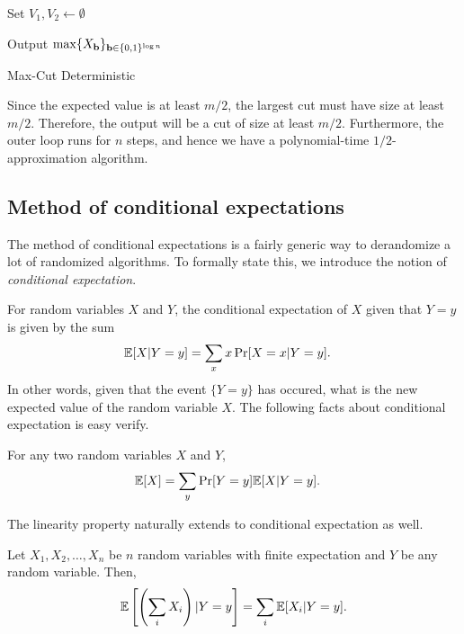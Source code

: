 \begin{algorithm}
	
	Set $V_1, V_2 \gets \emptyset$
	
	
	Output $\max \{X_{\mathbf{b}}\}_{\mathbf{b} \in \{0,1\}^{\log n}}$

	\caption{Max-Cut Deterministic}
	\label{alg:maxcut-det}
\end{algorithm}

Since the expected value is at least $m/2$, the largest cut must have size at least $m/2$. Therefore, the output will be a cut of size at least $m/2$. Furthermore, the outer loop runs for $n$ steps, and hence we have a polynomial-time $1/2$-approximation algorithm.

\subsection{Method of conditional expectations}

The method of conditional expectations is a fairly generic way to derandomize a
lot of randomized algorithms.  To formally state this, we introduce the notion
of \emph{conditional expectation}.

For random variables $X$ and $Y$, the conditional expectation of $X$ given that
$Y=y$ is given by the sum
\begin{align*}
	\mathbb{E}[X|Y=y] &= \sum_{x} x \Pr[X=x|Y=y].
\end{align*}
In other words, given that the event $\{Y=y\}$ has occured, what is the new
expected value of the random variable $X$. The following facts about conditional
expectation is easy verify.
\begin{fact}
	For any two random variables $X$ and $Y$, 
	\begin{align*}
		\mathbb{E}[X] &= \sum_{y} \Pr[Y=y] \mathbb{E}[X|Y=y].
	\end{align*}
\end{fact}

The linearity property naturally extends to conditional expectation as well.
\begin{fact}
  Let $X_1, X_2, \ldots, X_n$ be $n$ random variables with finite expectation
  and $Y$ be any random variable. Then,
  \begin{align*}
    \mathbb{E}\left[ \left(\sum_i X_i\right) | Y=y \right] = \sum_i \mathbb{E}[X_i | Y=y]. 
  \end{align*}
\end{fact}

